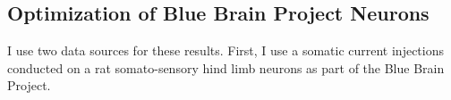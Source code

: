 

\subsection{Optimization of Blue Brain Project Neurons}
I use two data sources for these results.
First, I use a somatic current injections conducted on a rat somato-sensory hind limb neurons as part of the Blue Brain Project.

